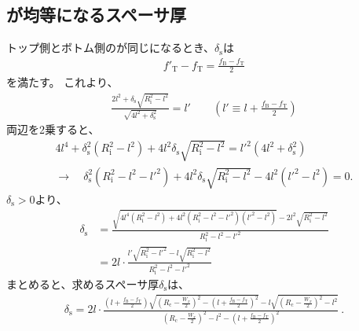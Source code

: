 \subsection{\AlocationLength が均等になるスペーサ厚}
トップ側とボトム側の\AlocationLength が同じになるとき、$\delta_\mathrm s$は
\begin{align*}
  f'_\mathrm T - f_\mathrm T = \frac{f_\mathrm B - f_\mathrm T}2
\end{align*}
を満たす。
これより、
\begin{align*}
  \frac{2l^2+\delta_\mathrm s\sqrt{R_\mathrm i^2-l^2}}{\sqrt{4l^2+\delta_\mathrm s^2}} = l'\qquad
  \left(l' \equiv l + \frac{f_\mathrm B-f_\mathrm T}2\right)
\end{align*}
両辺を2乗すると、
\begin{gather*}
  4l^4+\delta_\mathrm s^2\left(R_\mathrm i^2-l^2\right)+4l^2\delta_\mathrm s\sqrt{R_\mathrm i^2-l^2}
  = l'^2\left(4l^2+\delta_\mathrm s^2\right)\\
  \longrightarrow\quad
  \delta_\mathrm s^2\left(R_\mathrm i^2-l^2-l'^2\right)
  +4l^2\delta_\mathrm s\sqrt{R_\mathrm i^2-l^2} -4l^2\left(l'^2 - l^2\right)
  = 0.
\end{gather*}
$\delta_\mathrm s > 0$より、
\begin{align*}
  \delta_\mathrm s
  &= \frac{\sqrt{4l^4\left(R_\mathrm i^2-l^2\right)
                 +4l^2\left(R_\mathrm i^2-l^2-l'^2\right)\left(l'^2 - l^2\right)}
           -2l^2\sqrt{R_\mathrm i^2-l^2}}{R_\mathrm i^2-l^2-l'^2}\\
  &= 2l\cdot\frac{l'\sqrt{R_\mathrm i^2-l'^2}-l\sqrt{R_\mathrm i^2-l^2}}{R_\mathrm i^2-l^2-l'^2}
\end{align*}
まとめると、求めるスペーサ厚$\delta_\mathrm s$は、
\begin{align*}
  \delta_\mathrm s
  = 2l\cdot
    \frac{\displaystyle
          \left(l+\frac{f_\mathrm B-f_\mathrm T}2\right)
          \sqrt{\left(R_\mathrm c-\frac{W_x}2\right)^2
                -\left(l+\frac{f_\mathrm B-f_\mathrm T}2\right)^2}
          -l\sqrt{\left(R_\mathrm c-\frac{W_x}2\right)^2-l^2}}
         {\displaystyle
          \left(R_\mathrm c-\frac{W_x}2\right)^2-l^2
          -\left(l+\frac{f_\mathrm B-f_\mathrm T}2\right)^2}~.
\end{align*}



